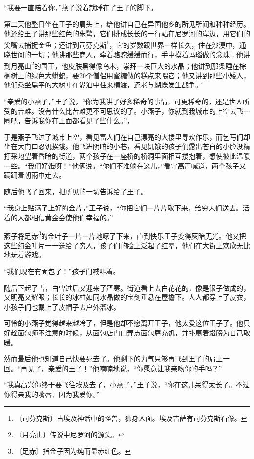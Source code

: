 \documentclass[12pt,UTF-8,openany]{ctexbook}
\begin{document}
\begin{large}
    “我要一直陪着你，”燕子说着就睡在了王子的脚下。
    
    第二天他整日坐在王子的肩头上，给他讲自己在异国他乡的所见所闻和种种经历。他还给王子讲那些红色的朱鹭，它们排成长长的一行站在尼罗河的岸边，用它们的尖嘴去捕捉金鱼；还讲到司芬克斯\footnote{〔司芬克斯〕古埃及神话中的怪兽，狮身人面。埃及吉萨有司芬克斯石像。}，它的岁数跟世界一样长久，住在沙漠中，通晓世间的一切；他讲那些商人，牵着骆驼缓缓而行，手中摸着玛瑙做的念珠；他讲到月亮山\footnote{〔月亮山〕传说中尼罗河的源头。}的国王，他皮肤黑得像乌木，崇拜一块巨大的水晶；他讲到那条睡在棕榈树上的绿色大蟒蛇，要20个僧侣用蜜糖做的糕点来喂它；他又讲到那些小矮人，他们乘坐扁平的大树叶在湖泊中往来横渡，还老与蝴蝶发生战争。”
    
    “亲爱的小燕子，”王子说，“你为我讲了好多稀奇的事情，可更稀奇的，还是世人所受的苦难。没有什么比苦难更不可思议的了。小燕子，你就到我城市的上空去飞一圈吧，告诉我你在上面都看见了些什么。”，
    
    于是燕子飞过了城市上空，看见富人们在自己漂亮的大楼里寻欢作乐，而乞丐们却坐在大门口忍饥挨饿。他飞进阴暗的小巷，看见饥饿的孩子们露出苍白的小脸没精打采地望着昏暗的街道，两个孩子在一座桥的桥洞里面相互搂抱着，想使彼此温暖一些。“我们好饿呀！”他俩说。“你们不准躺在这儿，”看守高声喊道，两个孩子又蹒跚着朝雨中走去。
    
    随后他飞了回来，把所见的一切告诉给了王子。
    
    “我身上贴满了上好的金片，”王子说，“你把它们一片片取下来，给穷人们送去。活着的人都相信黄金会使他们幸福的。”
    
    燕子将足赤\footnote{〔足赤〕指金子因为纯而显赤红色。}的金叶子一片一片地啄了下来，直到快乐王子变得灰暗无光。他又把这些纯金叶片一一送给了穷人，孩子们的脸上泛起了红晕，他们在大街上欢欣无比地玩着游戏。
    
    “我们现在有面包了！”孩子们喊叫着。
    
    随后下起了雪，白雪过后又迎来了严寒。街道看上去白花花的，像是银子做成的，又明亮又耀眼；长长的冰柱如同水晶做的宝剑垂悬在屋檐下。人人都穿上了皮衣，小孩子们也戴上了皮帽子去户外溜冰。
    
    可怜的小燕子觉得越来越冷了，但是他却不愿离开王子，他太爱这位王子了。他只好趁面包师不注意的时候，从面包店门口弄点面包屑充饥，并扑扇着翅膀为自己取暖。
    
    然而最后他也知道自己快要死去了。他剩下的力气只够再飞到王子的肩上一回。“再见了，亲爱的王子！”他喃喃地说，“你愿意让我亲吻你的手吗？”
    
    “我真高兴你终于要飞往埃及去了，小燕子，”王子说，“你在这儿呆得太长了。不过你得亲我的嘴唇，因为我爱你。”
    

\end{large}
\end{document}
